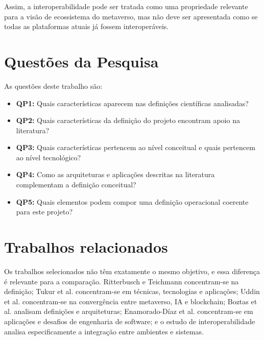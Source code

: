 Assim, a interoperabilidade pode ser tratada como uma propriedade relevante para a visão de ecossistema do metaverso, mas não deve ser apresentada como se todas as plataformas atuais já fossem interoperáveis.

\section{Questões da Pesquisa}
\label{cha:questoes}

As questões deste trabalho são:

\begin{itemize}
    \item \textbf{QP1:} Quais características aparecem nas definições científicas analisadas?
    \item \textbf{QP2:} Quais características da definição do projeto encontram apoio na literatura?
    \item \textbf{QP3:} Quais características pertencem ao nível conceitual e quais pertencem ao nível tecnológico?
    \item \textbf{QP4:} Como as arquiteturas e aplicações descritas na literatura complementam a definição conceitual?
    \item \textbf{QP5:} Quais elementos podem compor uma definição operacional coerente para este projeto?
\end{itemize}

\section{Trabalhos relacionados}
\label{cha:relacionados}

Os trabalhos selecionados não têm exatamente o mesmo objetivo, e essa diferença é relevante para a comparação. Ritterbusch e Teichmann concentram-se na definição; Tukur et al. concentram-se em técnicas, tecnologias e aplicações; Uddin et al. concentram-se na convergência entre metaverso, IA e blockchain; Boztas et al. analisam definições e arquiteturas; Enamorado-Díaz et al. concentram-se em aplicações e desafios de engenharia de software; e o estudo de interoperabilidade analisa especificamente a integração entre ambientes e sistemas. \cite{ritterbusch2023,tukur2024,uddin2024,boztas2025,enamorado2025,yang2025}

